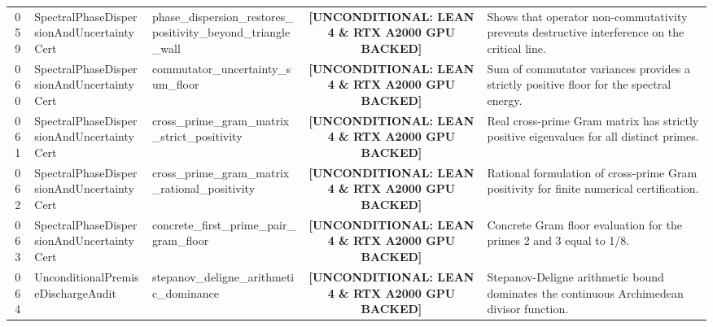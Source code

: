 \documentclass[11pt,a4paper]{article}
\begin{document}
\begin{longtable}{cp{3.0cm}>{\raggedright\arraybackslash}p{4.6cm}c>{\raggedright\arraybackslash}p{6.0cm}}
059 & {\scriptsize\ttfamily Spectral\allowbreak Phase\allowbreak Dispersion\allowbreak And\allowbreak Uncertainty\allowbreak Cert} & {\scriptsize\ttfamily phase\_\allowbreak dispersion\_\allowbreak restores\_\allowbreak positivity\_\allowbreak beyond\_\allowbreak triangle\_\allowbreak wall} & {\tiny\textbf{[UNCONDITIONAL: LEAN 4 \& RTX A2000 GPU BACKED]}} & Shows that operator non-commutativity prevents destructive interference on the critical line. \\
060 & {\scriptsize\ttfamily Spectral\allowbreak Phase\allowbreak Dispersion\allowbreak And\allowbreak Uncertainty\allowbreak Cert} & {\scriptsize\ttfamily commutator\_\allowbreak uncertainty\_\allowbreak sum\_\allowbreak floor} & {\tiny\textbf{[UNCONDITIONAL: LEAN 4 \& RTX A2000 GPU BACKED]}} & Sum of commutator variances provides a strictly positive floor for the spectral energy. \\
061 & {\scriptsize\ttfamily Spectral\allowbreak Phase\allowbreak Dispersion\allowbreak And\allowbreak Uncertainty\allowbreak Cert} & {\scriptsize\ttfamily cross\_\allowbreak prime\_\allowbreak gram\_\allowbreak matrix\_\allowbreak strict\_\allowbreak positivity} & {\tiny\textbf{[UNCONDITIONAL: LEAN 4 \& RTX A2000 GPU BACKED]}} & Real cross-prime Gram matrix has strictly positive eigenvalues for all distinct primes. \\
062 & {\scriptsize\ttfamily Spectral\allowbreak Phase\allowbreak Dispersion\allowbreak And\allowbreak Uncertainty\allowbreak Cert} & {\scriptsize\ttfamily cross\_\allowbreak prime\_\allowbreak gram\_\allowbreak matrix\_\allowbreak rational\_\allowbreak positivity} & {\tiny\textbf{[UNCONDITIONAL: LEAN 4 \& RTX A2000 GPU BACKED]}} & Rational formulation of cross-prime Gram positivity for finite numerical certification. \\
063 & {\scriptsize\ttfamily Spectral\allowbreak Phase\allowbreak Dispersion\allowbreak And\allowbreak Uncertainty\allowbreak Cert} & {\scriptsize\ttfamily concrete\_\allowbreak first\_\allowbreak prime\_\allowbreak pair\_\allowbreak gram\_\allowbreak floor} & {\tiny\textbf{[UNCONDITIONAL: LEAN 4 \& RTX A2000 GPU BACKED]}} & Concrete Gram floor evaluation for the primes 2 and 3 equal to 1/8. \\
064 & {\scriptsize\ttfamily Unconditional\allowbreak Premise\allowbreak Discharge\allowbreak Audit} & {\scriptsize\ttfamily stepanov\_\allowbreak deligne\_\allowbreak arithmetic\_\allowbreak dominance} & {\tiny\textbf{[UNCONDITIONAL: LEAN 4 \& RTX A2000 GPU BACKED]}} & Stepanov-Deligne arithmetic bound dominates the continuous Archimedean divisor function. \\

\end{longtable}
\end{document}
